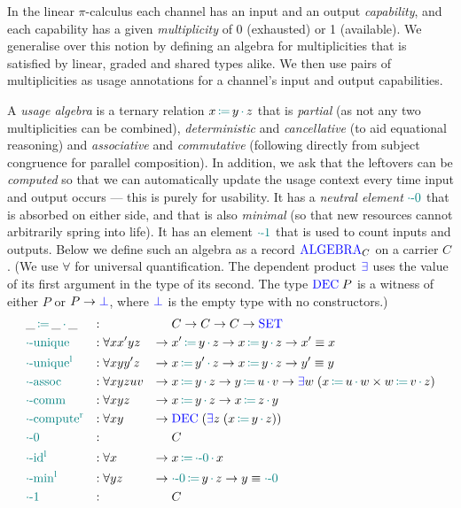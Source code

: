 \documentclass[runningheads]{llncs}
\newcommand{\picalc}{$\pi$-calculus}
\newcommand{\type}[1]{\textcolor{blue}{\operatorname{#1}}}
\newcommand{\func}[1]{\textcolor{teal}{\operatorname{#1}}}
\newcommand{\op}[3]{#1 \, \func{\coloneqq} \, #2 \, \func{\cdot} \, #3}
\newcommand{\zero}{\func{\cdot-0}}
\newcommand{\one}{\func{\cdot-1}}
\newcommand{\Set}{\type{SET}}
\newcommand{\Algebra}{\type{ALGEBRA}}
\begin{document}
In the linear \picalc{} each channel has an input and an output \emph{capability}, and each capability has a given \emph{multiplicity} of 0 (exhausted) or 1 (available).
We generalise over this notion by defining an algebra for multiplicities that is satisfied by linear, graded and shared types alike.
We then use pairs of multiplicities as usage annotations for a channel's input and output capabilities.

\begin{nidefinition}
  A \emph{usage algebra} is a ternary relation $\op{x}{y}{z}$ that is \emph{partial} (as not any two multiplicities can be combined), \emph{deterministic} and \emph{cancellative} (to aid equational reasoning) and \emph{associative} and \emph{commutative} (following directly from subject congruence for parallel composition).
  In addition, we ask that the leftovers can be \emph{computed} so that we can automatically update the usage context every time input and output occurs --- this is purely for usability.
  It has a \emph{neutral element} $\zero$ that is absorbed on either side, and that is also \emph{minimal} (so that new resources cannot arbitrarily spring into life).
  It has an element $\one$ that is used to count inputs and outputs.
  Below we define such an algebra as a record $\Algebra_C$ on a carrier $C$.
  (We use $\forall$ for universal quantification.
  The dependent product $\type{\exists}$ uses the value of its first argument in the type of its second.
  The type $\type{DEC} \; P$ is a witness of either $P$ or $P \to \type{\bot}$, where $\type{\bot}$ is the empty type with no constructors.)
  \begin{equation*}
  \begin{aligned}
    &\op{\_}{\_}{\_}         &:{} &                 &        & C \to C \to C \to \Set \\
    &\func{\cdot-unique}     &:{} &\forall x x' y z  & \to \; & \op{x'}{y}{z} \to \op{x}{y}{z} \to x' \equiv x \\
    &\func{\cdot-unique^l}   &:{} &\forall x y y' z  & \to \; & \op{x}{y'}{z} \to \op{x}{y}{z} \to y' \equiv y \\
    &\func{\cdot-assoc}      &:{} &\forall x y z u v & \to \; & \op{x}{y}{z} \to \op{y}{u}{v} \to \type{\exists} w  \; (\op{x}{u}{w} \times \op{w}{v}{z}) \\
    &\func{\cdot-comm}       &:{} &\forall x y z     & \to \; & \op{x}{y}{z} \to \op{x}{z}{y} \\
    &\func{\cdot-compute^r}  &:{} &\forall x y       & \to \; & \type{DEC} \; (\type{\exists} z  \; (\op{x}{y}{z})) \\
    &\zero                   &:{} &                 &        & C \\
    &\func{\cdot-id^l}       &:{} &\forall x         & \to \; & \op{x}{\zero}{x} \\
    &\func{\cdot-min^l}      &:{} &\forall y z        & \to \; & \op{\zero}{y}{z} \to y \equiv \zero \\
    &\one                    &:{} &                 &        & C \\
  \end{aligned}
  \end{equation*}
\end{nidefinition}
\end{document}
